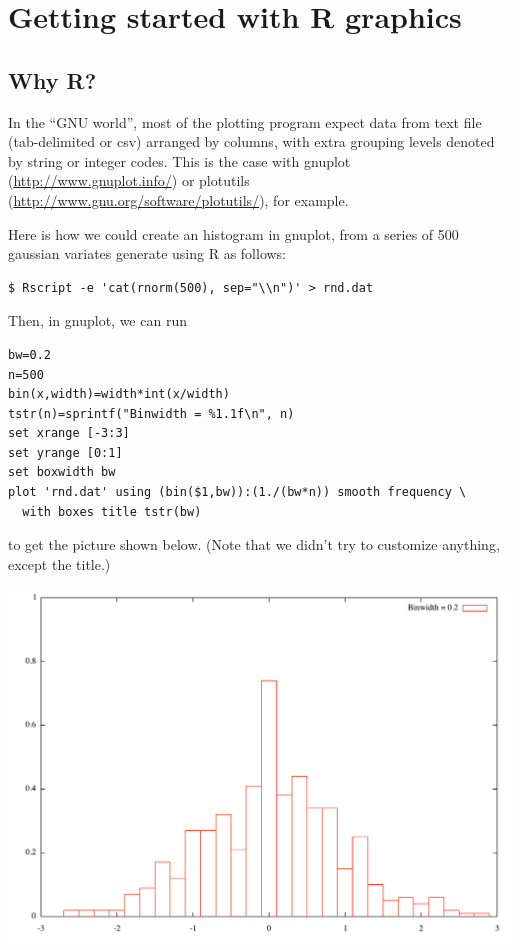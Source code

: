 \documentclass[a4paper,twoside]{book}
\newcommand{\R}{\textsf{R}\xspace}
\begin{document}
\mainmatter
{}
\chapter{Getting started with \R graphics}

\section{Why \R?}
In the ``GNU world'', most of the plotting program expect data from
text file (tab-delimited or csv) arranged by columns, with extra
grouping levels denoted by string or integer codes. This is the case
with \textsf{gnuplot}\autocite{janert09} (\url{http://www.gnuplot.info/}) or
\textsf{plotutils} (\url{http://www.gnu.org/software/plotutils/}), for
example. 

Here is how we could create an histogram in gnuplot, from a series of
500 gaussian variates generate using \R as follows:
\begin{verbatim}
$ Rscript -e 'cat(rnorm(500), sep="\\n")' > rnd.dat
\end{verbatim}

Then, in gnuplot, we can run
\begin{verbatim}
bw=0.2
n=500
bin(x,width)=width*int(x/width)
tstr(n)=sprintf("Binwidth = %1.1f\n", n)
set xrange [-3:3]
set yrange [0:1]
set boxwidth bw
plot 'rnd.dat' using (bin($1,bw)):(1./(bw*n)) smooth frequency \
  with boxes title tstr(bw)
\end{verbatim}

to get the picture shown below. (Note that we didn't try to customize
anything, except the title.)

\centerline{\includegraphics[width=.75\textwidth]{gnuplot}}
\end{document}
